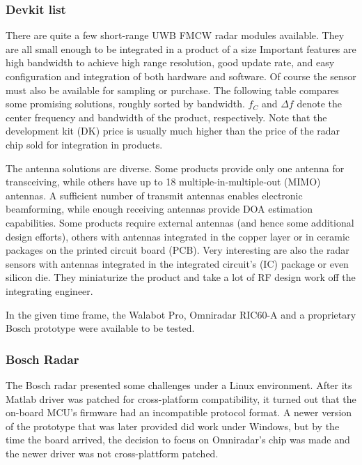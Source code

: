 \subsubsection{Devkit list}\label{devkit-list}

There are quite a few short-range UWB FMCW radar modules available. They are all small enough to be integrated in a product of a size Important features are high bandwidth to achieve high range resolution, good update rate, and easy configuration and integration of both hardware and software. Of course the sensor must also be available for sampling or purchase. The following table compares some promising solutions, roughly sorted by bandwidth. $f_C$ and $\Delta f$ denote the center frequency and bandwidth of the product, respectively. Note that the development kit (DK) price is usually much higher than the price of the radar chip sold for integration in products.



The antenna solutions are diverse. Some products provide only one antenna for transceiving, while others have up to 18 multiple-in-multiple-out (MIMO) antennas. A sufficient number of transmit antennas enables electronic beamforming, while enough receiving antennas provide DOA estimation capabilities. Some products require external antennas (and hence some additional design efforts), others with antennas integrated in the copper layer or in ceramic packages on the printed circuit board (PCB). Very interesting are also the radar sensors with antennas integrated in the integrated circuit's (IC) package or even silicon die. They miniaturize the product and take a lot of RF design work off the integrating engineer.

In the given time frame, the Walabot Pro, Omniradar RIC60-A and a proprietary Bosch prototype were available to be tested.

\subsubsection{Bosch Radar}\label{bosch-radar}

The Bosch radar presented some challenges under a Linux environment. After its Matlab driver was patched for cross-platform compatibility, it turned out that the on-board MCU's firmware had an incompatible protocol format. A newer version of the prototype that was later provided did work under Windows, but by the time the board arrived, the decision to focus on Omniradar's chip was made and the newer driver was not cross-plattform patched.

